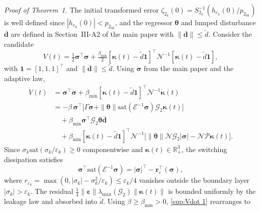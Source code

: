 \documentclass[10pt,journal]{IEEEtran}
\begin{document}
\textit{Proof of Theorem~1.} The initial transformed error $\zeta_{2_k}(0) = S_{2_k}^{-1}(h_{e_k}(0)/p_{2_{0k}})$ is well defined since $|h_{e_k}(0)|<p_{2_{0k}}$, and the regressor $\boldsymbol{\theta}$ and lumped disturbance $\boldsymbol{\overline{d}}$ are defined in Section~III-A2 of the main paper with $\|\boldsymbol{\overline{d}}\|\le\tilde{d}$. Consider the candidate
\begin{equation} \label{sup:Lyapunov function}
    V(t) = \tfrac12\boldsymbol{\sigma}^\top\boldsymbol{\sigma} + \tfrac{\beta_{\min}}{2}[\boldsymbol{\kappa}(t)-\tilde{d}\boldsymbol{1}]^\top\mathcal{N}^{-1}[\boldsymbol{\kappa}(t)-\tilde{d}\boldsymbol{1}],
\end{equation}
with $\boldsymbol{1}=[1,1,1]^\top$ and $\|\boldsymbol{\overline{d}}\|\le\tilde{d}$. Using $\dot{\boldsymbol{\sigma}}$ from the main paper and the adaptive law,
\begin{align}
\label{sup:Vdot 1}
\dot{V}(t) &= \boldsymbol{\sigma}^\top\dot{\boldsymbol{\sigma}} + \beta_{\min}[\boldsymbol{\kappa}(t)-\tilde{d}\boldsymbol{1}]^\top\mathcal{N}^{-1}\dot{\boldsymbol{\kappa}}(t)\nonumber\\
&= -\beta\,\boldsymbol{\sigma}^\top\!\big[\Gamma\boldsymbol{\sigma}+\|\boldsymbol{\theta}\|\text{sat}(\mathcal{E}^{-1}\boldsymbol{\sigma})\mathcal{G}_2\boldsymbol{\kappa}(t)\big]\nonumber\\
&\quad + \beta_{\min}\boldsymbol{\sigma}^\top\mathcal{G}_2\boldsymbol{\theta}\boldsymbol{\overline{d}}\nonumber\\
&\quad + \beta_{\min}[\boldsymbol{\kappa}(t)-\tilde{d}\boldsymbol{1}]^\top\mathcal{N}^{-1}\!\big[\|\boldsymbol{\theta}\|\mathcal{N}\mathcal{G}_2|\boldsymbol{\sigma}| - \mathcal{N}\mathcal{P}\boldsymbol{\kappa}(t)\big].
\end{align}
Since $\sigma_k\text{sat}(\sigma_k/\varepsilon_k)\ge 0$ componentwise and $\boldsymbol{\kappa}(t)\in\mathbb{R}_+^3$, the switching dissipation satisfies
\begin{equation*}
\boldsymbol{\sigma}^\top\text{sat}(\mathcal{E}^{-1}\boldsymbol{\sigma}) = |\boldsymbol{\sigma}|^\top - \boldsymbol{r}_\varepsilon^\top(\boldsymbol{\sigma}),
\end{equation*}
where $r_{\varepsilon_k} = \max(0,|\sigma_k|-\sigma_k^2/\varepsilon_k)\le\varepsilon_k/4$ vanishes outside the boundary layer $|\sigma_k|>\varepsilon_k$. The residual $\tfrac14\|\boldsymbol{\varepsilon}\|\lambda_{\max}(\mathcal{G}_2)\|\boldsymbol{\kappa}(t)\|$ is bounded uniformly by the leakage law and absorbed into $\tilde{d}$. Using $\beta\ge\beta_{\min}>0$, \eqref{sup:Vdot 1} rearranges to
\end{document}
